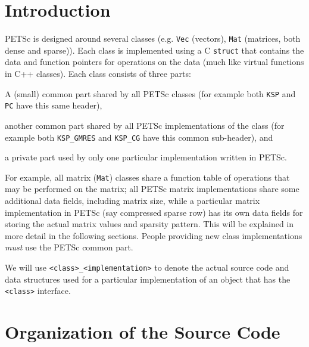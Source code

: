 \section{Introduction}

PETSc is designed around several classes (e.g. \lstinline{Vec} (vectors),
\lstinline{Mat} (matrices, both dense and sparse)). Each class is 
implemented using a C \lstinline{struct} that contains the data and function pointers
for operations on the data (much like virtual functions in C++ classes).
Each class consists of three parts:
\begin{tightenumerate}
  \item A (small) common part shared by all PETSc classes (for example both \lstinline{KSP} and \lstinline{PC} have this same header),
  \item another common part shared by all PETSc implementations of the class (for example both \lstinline{KSP_GMRES} and \lstinline{KSP_CG} have this common sub-header), and
  \item a private part used by only one particular implementation written in PETSc.
\end{tightenumerate}
For example, all matrix (\lstinline{Mat}) classes share a function table of operations that
may be performed on the matrix; all PETSc matrix implementations share some additional
data fields, including matrix size, while a particular matrix implementation in PETSc
(say compressed sparse row) has its own data fields for storing the actual
matrix values and sparsity pattern. This will be explained in more detail
in the following sections. People providing new class implementations {\em must}
use the PETSc common part.


We will use \lstinline{<class>_<implementation>} to denote the actual source code and
data structures used for a particular implementation of an object that has the
\lstinline{<class>} interface.

\section{Organization of the Source Code}

